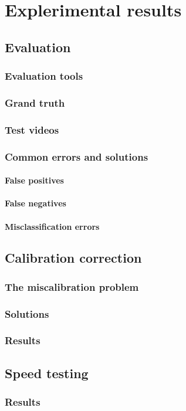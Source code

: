 \chapter{Explerimental results}\label{chap:Tets}
\section{Evaluation}

\subsection{Evaluation tools}
\subsection{Grand truth}
\subsection{Test videos}

\subsection{Common errors and solutions}
\subsubsection{False positives}
\subsubsection{False negatives}
\subsubsection{Misclassification errors}

\section{Calibration correction}

\subsection{The miscalibration problem}
\subsection{Solutions}
\subsection{Results}

\section{Speed testing}

\subsection{Results}
